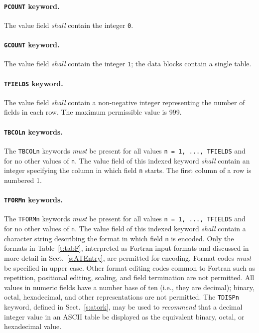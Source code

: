 \documentclass[onecolumn]{aa}
\begin{document}
   \paragraph{{\tt PCOUNT} keyword.}
 The value field {\em shall} contain the integer {\tt 0}. 
  
   \paragraph{{\tt GCOUNT} keyword.}
 The value field {\em shall} contain the integer {\tt 1}; the data
 blocks contain a single table.
  
   \paragraph{{\tt TFIELDS} keyword.}
 The value field {\em shall} contain a non-negative integer 
 representing
 the number of fields in each row.  The maximum
 permissible value is 999.
  
   \paragraph{{\tt TBCOLn} keywords.}
 The {\tt TBCOLn} keywords {\em must} be present for all values 
 {\tt n = 1, ..., TFIELDS} and for no other values of {\tt n}.
 The value field of this indexed keyword {\em shall} contain an 
 integer
 specifying the column in which field {\tt n} starts.  
 The first column of a row is numbered 1.

   \paragraph{{\tt TFORMn} keywords.}   
 The {\tt TFORMn} keywords {\em must} be present for all values 
 {\tt n = 1, ..., TFIELDS} and for no other values of {\tt n}.
 The value field of this indexed keyword 
 {\em shall} contain a character string describing the format in
 which field {\tt n} is encoded.  Only the formats 
 in Table~\ref{t:tabF}, interpreted as Fortran \citep{iso04} 
 input formats and discussed in more detail in
 Sect.\ \ref{s:ATEntry}, are permitted for encoding. Format
 codes {\em must} be specified in upper case.  Other format
 editing codes common to   Fortran such as repetition, positional
 editing, scaling, and field termination are not permitted.  All values
 in numeric fields have a number base of ten (i.e., they are decimal);
 binary, octal, hexadecimal, and other representations are not
 permitted.  The {\tt TDISPn} keyword, defined in Sect.\ \ref{s:atork},
 may be used to {\em recommend} that a decimal integer value in an
 ASCII table be displayed as the equivalent binary, octal, or hexadecimal
 value.
\end{document}
